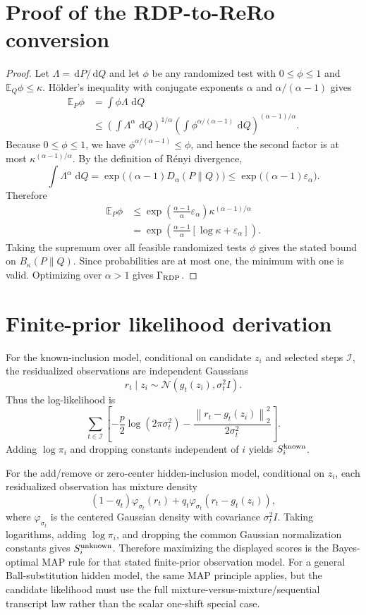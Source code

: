 \documentclass[11pt,a4paper]{report}
\theoremstyle{plain}
\theoremstyle{definition}
\theoremstyle{remark}
\newcommand{\N}{\mathcal{N}}
\newcommand{\E}{\mathbb{E}}
\newcommand{\dd}{\,\mathrm d}
\newcommand{\norm}[1]{\left\lVert #1\right\rVert}
\begin{document}
\section{Proof of the RDP-to-ReRo conversion}
\label{app:rdp-proof}

\begin{proof}
Let $\Lambda=\dd P/\dd Q$ and let $\phi$ be any randomized test with
$0\le\phi\le1$ and $\E_Q\phi\le\kappa$.  H\"older's inequality with conjugate
exponents $\alpha$ and $\alpha/(\alpha-1)$ gives
\begin{align*}
\E_P\phi
&=\int \phi\Lambda\,\dd Q\\
&\le
\left(\int \Lambda^\alpha\,\dd Q\right)^{1/\alpha}
\left(\int \phi^{\alpha/(\alpha-1)}\,\dd Q\right)^{(\alpha-1)/\alpha}.
\end{align*}
Because $0\le\phi\le1$, we have
$\phi^{\alpha/(\alpha-1)}\le\phi$, and hence the second factor is at most
$\kappa^{(\alpha-1)/\alpha}$.  By the definition of R\'enyi divergence,
\[
\int \Lambda^\alpha\,\dd Q
=
\exp\bigl((\alpha-1)D_\alpha(P\|Q)\bigr)
\le
\exp\bigl((\alpha-1)\varepsilon_\alpha\bigr).
\]
Therefore
\begin{align*}
\E_P\phi
&\le
\exp\left(\frac{\alpha-1}{\alpha}\varepsilon_\alpha\right)
\kappa^{(\alpha-1)/\alpha}\\
&=
\exp\left(
\frac{\alpha-1}{\alpha}
[\log\kappa+\varepsilon_\alpha]
\right).
\end{align*}
Taking the supremum over all feasible randomized tests $\phi$ gives the stated
bound on $B_\kappa(P\|Q)$.  Since probabilities are at most one, the minimum
with one is valid.  Optimizing over $\alpha>1$ gives $\Gamma_{\rm RDP}$.
\end{proof}

\section{Finite-prior likelihood derivation}
\label{app:finite-prior-proof}

For the known-inclusion model, conditional on candidate $z_i$ and selected
steps $\mathcal I$, the residualized observations are independent Gaussians
\[
r_t\mid z_i\sim\N(g_t(z_i),\sigma_t^2I).
\]
Thus the log-likelihood is
\[
\sum_{t\in\mathcal I}
\left[-\frac{p}{2}\log(2\pi\sigma_t^2)
-
\frac{\norm{r_t-g_t(z_i)}_2^2}{2\sigma_t^2}
\right].
\]
Adding $\log\pi_i$ and dropping constants independent of $i$ yields
$S_i^{\rm known}$.

For the add/remove or zero-center hidden-inclusion model, conditional on
$z_i$, each residualized observation has mixture density
\[
(1-q_t)\varphi_{\sigma_t}(r_t)
+
q_t\varphi_{\sigma_t}(r_t-g_t(z_i)),
\]
where $\varphi_{\sigma_t}$ is the centered Gaussian density with covariance
$\sigma_t^2I$.  Taking logarithms, adding $\log\pi_i$, and dropping the common
Gaussian normalization constants gives $S_i^{\rm unknown}$.  Therefore
maximizing the displayed scores is the Bayes-optimal MAP rule for that stated
finite-prior observation model.  For a general Ball-substitution hidden model,
the same MAP principle applies, but the candidate likelihood must use the full
mixture-versus-mixture/sequential transcript law rather than the scalar
one-shift special case.
\end{document}
